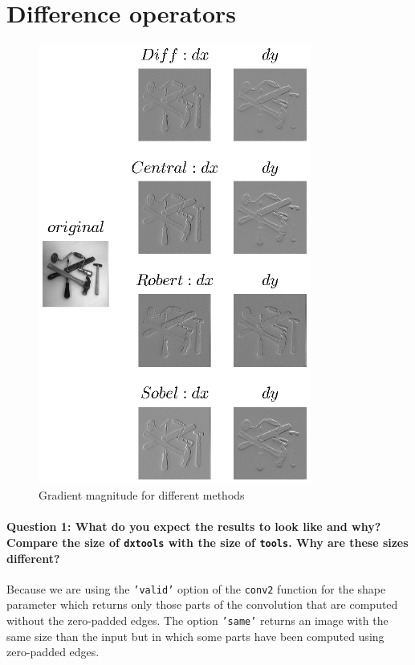 \documentclass[12pt]{article}
\begin{document}
\maketitle

\section{Difference operators}

\begin{figure}[htbp]
 \centering
 \includegraphics[width=0.8\textwidth]{q1}
 \caption{Gradient magnitude for different methods}
 \label{fig:q1}
\end{figure}

\paragraph{Question 1: 
What do you expect the results to look like and why? Compare the size of \texttt{dxtools} with the size of \texttt{tools}. Why are these sizes different?} 
Because we are using the \texttt{'valid'} option of the \texttt{conv2} function for the shape parameter which returns only those parts of the convolution that are computed without the zero-padded edges. The option \texttt{'same'} returns an image with the same size than the input but in which some parts have been computed using zero-padded edges.
\end{document}

